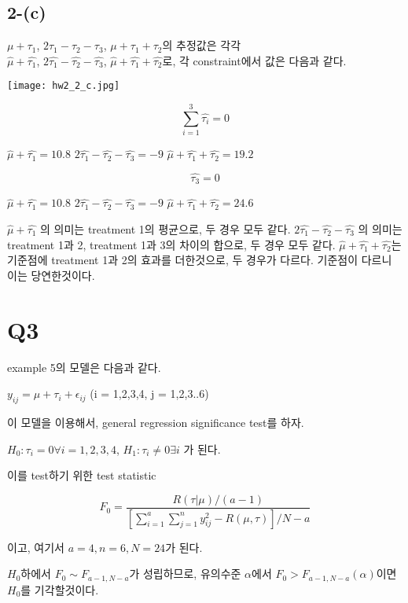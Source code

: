 \documentclass{article}
\begin{document}
\subsection{2-(c)}

$\mu + \tau_1$, $2\tau_1 - \tau_2 - \tau_3$, $\mu + \tau_1 + \tau_2$의 추정값은 각각 \\
$\hat{\mu} + \hat{\tau_1}$, $2\hat{\tau_1} - \hat{\tau_2} - \hat{\tau_3}$, $\hat{\mu} + \hat{\tau_1} + \hat{\tau_2}$로, 각 constraint에서 값은 다음과 같다.

\begin{center}
    \texttt{[image: hw2\_2\_c.jpg]}
\end{center} 

$$\sum_{i=1}^{3} \hat{\tau_i} = 0$$

$\hat{\mu} + \hat{\tau_1} = 10.8$
$2\hat{\tau_1} - \hat{\tau_2} - \hat{\tau_3} = -9$ 
$\hat{\mu} + \hat{\tau_1} + \hat{\tau_2} = 19.2$


$$\hat{\tau_3}=0$$

$\hat{\mu} + \hat{\tau_1} = 10.8$
$2\hat{\tau_1} - \hat{\tau_2} - \hat{\tau_3} = -9$ 
$\hat{\mu} + \hat{\tau_1} + \hat{\tau_2} = 24.6$

$\hat{\mu} + \hat{\tau_1}$ 의 의미는 treatment 1의 평균으로, 두 경우 모두 같다.
$2\hat{\tau_1} - \hat{\tau_2} - \hat{\tau_3}$ 의 의미는 treatment 1과 2, treatment 1과 3의 차이의 합으로, 두 경우 모두 같다.
 $\hat{\mu} + \hat{\tau_1} + \hat{\tau_2}$는 기준점에 treatment 1과 2의 효과를 더한것으로, 두 경우가 다르다.
기준점이 다르니 이는 당연한것이다.

\section{Q3} 

example 5의 모델은 다음과 같다.

$y_{ij} = \mu + \tau_i + \epsilon_{ij}$ (i = 1,2,3,4, j = 1,2,3..6)

이 모델을 이용해서, general regression significance test를 하자.

$H_0 : \tau_i = 0 \forall i = 1,2,3,4$, $H_1 : \tau_i \neq 0 \exists i$ 가 된다.

이를 test하기 위한 test statistic

$$F_0 = \frac{R(\tau|\mu) / (a - 1) }{ [\sum_{i=1}^{a} \sum_{j=1}^n y_{ij}^2 - R(\mu,\tau)] / N - a}$$

이고, 여기서 $a = 4, n = 6, N = 24$가 된다.

$H_0$하에서 $F_0 \sim F_{a-1, N-a}$가 성립하므로, 유의수준 $\alpha$에서 $F_0 > F_{a-1,N-a}(\alpha)$이면 $H_0$를 기각할것이다.
\end{document}
